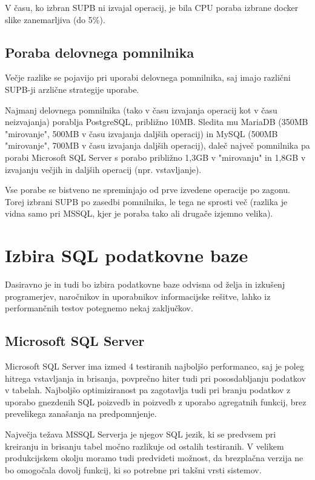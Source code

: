 \documentclass[a4paper,11pt]{report}
\begin{document}
V času, ko izbran SUPB ni izvajal operacij, je bila CPU poraba izbrane docker slike zanemarljiva (do 5\%).

\subsection{Poraba delovnega pomnilnika}
Večje razlike se pojavijo pri uporabi delovnega pomnilnika, saj imajo različni SUPB-ji arzlične strategije uporabe.

Najmanj delovnega pomnilnika (tako v času izvajanja operacij kot v času neizvajanja) porablja PostgreSQL, približno 10MB.
Sledita mu MariaDB (350MB "mirovanje", 500MB v času izvajanja daljših operacij) in MySQL (500MB "mirovanje", 700MB v času izvajanja daljših operacij), daleč največ pomnilnika pa porabi Microsoft SQL Server s porabo približno 1,3GB v "mirovanju"  in 1,8GB v izvajanju večjih in daljših operacij (npr. vstavljanje).

Vse porabe se bistveno ne spreminjajo od prve izvedene operacije po zagonu. Torej izbrani SUPB po zasedbi pomnilnika, le tega ne sprosti več (razlika je vidna samo pri MSSQL, kjer je poraba tako ali drugače izjemno velika).

\pagebreak
\section{Izbira SQL podatkovne baze}
Dasiravno je in tudi bo izbira podatkovne baze odvisna od želja in izkušenj programerjev, naročnikov in uporabnikov informacijske rešitve,
lahko iz performančnih testov potegnemo nekaj zaključkov.

\subsection{Microsoft SQL Server}
Microsoft SQL Server ima izmed 4 testiranih najboljšo performanco, saj je poleg hitrega vstavljanja in brisanja,
povprečno hiter tudi pri pososdabljanju podatkov v tabelah. Najboljšo optimiziranost pa zagotavlja tudi pri branju podatkov
z uporabo gnezdenih SQL poizvedb in poizvedb z uporabo agregatnih funkcij, brez prevelikega zanašanja na predpomnjenje.

Največja težava MSSQL Serverja je njegov SQL jezik, ki se predvsem pri kreiranju in brisanju tabel močno razlikuje od ostalih testiranih.
V velikem produkcijskem okolju moramo tudi predvideti možnost, da brezplačna verzija ne bo omogočala dovolj funkcij, ki so potrebne pri takšni vrsti sistemov.
\end{document}
